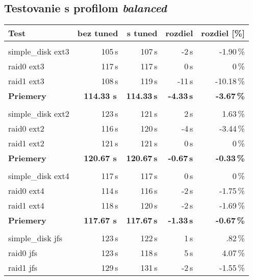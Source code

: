 %
%
\subsection{Testovanie s profilom \emph{balanced}}

{\renewcommand{\arraystretch}{1.1}
\begin{table}[H]
\begin{center}
\begin{tabular}{|l|r r r r|}
    \hline
    \textbf{Test} & \textbf{bez tuned} & \textbf{s tuned} & \textbf{rozdiel} & \textbf{rozdiel [\%]} \\
    \hline & \\[-1em]\hline
    simple\_disk ext3 & 105\,s & 107\,s & -2\,s & -1.90\,\% \\
    raid0 ext3 & 117\,s & 117\,s & 0\,s & 0\,\% \\
    raid1 ext3 & 108\,s & 119\,s & -11\,s & -10.18\,\% \\
    \hline
    \textbf{Priemery} & \textbf{114.33 s}\,& \textbf{114.33\,s} & \textbf{-4.33\,s} & \textbf{-3.67\,\%} \\
    \hline & \\[-1em]\hline
    simple\_disk ext2 & 123\,s & 121\,s & 2\,s & 1.63\,\% \\
    raid0 ext2 & 116\,s & 120\,s & -4\,s & -3.44\,\% \\
    raid1 ext2 & 121\,s & 121\,s & 0\,s & 0\,\% \\
    \hline
    \textbf{Priemery} & \textbf{120.67 s}\,& \textbf{120.67\,s} & \textbf{-0.67\,s} & \textbf{-0.33\,\%} \\
    \hline & \\[-1em]\hline
    simple\_disk ext4 & 117\,s & 117\,s & 0\,s & 0\,\% \\
    raid0 ext4 & 114\,s & 116\,s & -2\,s & -1.75\,\% \\
    raid1 ext4 & 118\,s & 120\,s & -2\,s & -1.69\,\% \\
    \hline
    \textbf{Priemery} & \textbf{117.67 s}\,& \textbf{117.67\,s} & \textbf{-1.33\,s} & \textbf{-0.67\,\%} \\
    \hline & \\[-1em]\hline
    simple\_disk jfs & 123\,s & 122\,s & 1\,s & .82\,\% \\
    raid0 jfs & 123\,s & 118\,s & 5\,s & 4.07\,\% \\
    raid1 jfs & 129\,s & 131\,s & -2\,s & -1.55\,\% \\

\end{tabular}
\end{center}
\end{table}}
